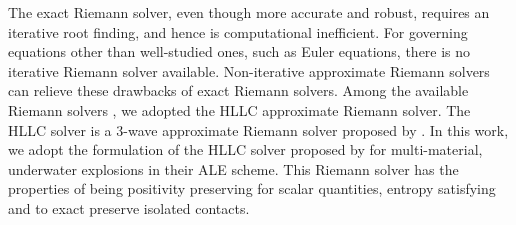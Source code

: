 The exact Riemann solver, even though more accurate and robust, requires an iterative root finding, and hence is computational inefficient. For governing equations other than well-studied ones, such as Euler equations, there is no iterative Riemann solver available. Non-iterative approximate Riemann solvers can relieve these drawbacks of exact Riemann solvers. Among the available Riemann solvers \citep{rider1994review, luo2004computation, puri2014approximate}, we adopted the HLLC approximate Riemann solver.
The HLLC solver is a 3-wave approximate Riemann solver proposed by \citet{toro1994restoration}. In this work, we adopt the formulation of the HLLC solver proposed by \citet{luo2004computation} for multi-material, underwater explosions in their ALE scheme. This Riemann solver has the properties of being positivity preserving for scalar quantities, entropy satisfying and to exact preserve isolated contacts.

